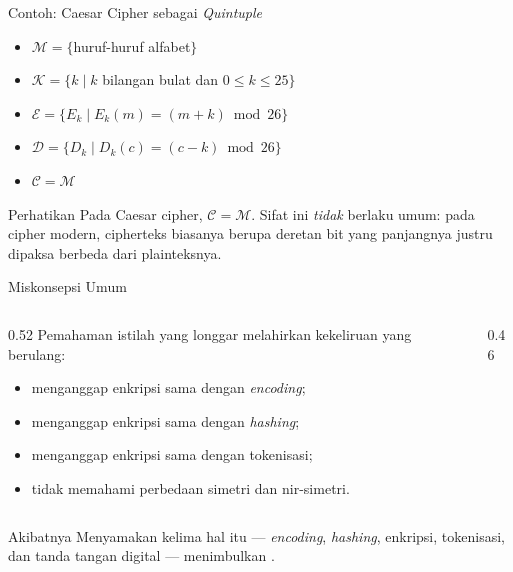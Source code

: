 \documentclass[aspectratio=169,11pt]{beamer}
\begin{document}
\begin{frame}{Contoh: Caesar Cipher sebagai \textit{Quintuple}}
    \begin{itemize}
        \item $\mathcal{M} = \{$huruf-huruf alfabet$\}$
        \item $\mathcal{K} = \{k \mid k$ bilangan bulat dan $0 \le k \le 25\}$
        \item $\mathcal{E} = \{E_k \mid E_k(m) = (m + k) \bmod 26\}$
        \item $\mathcal{D} = \{D_k \mid D_k(c) = (c - k) \bmod 26\}$
        \item $\mathcal{C} = \mathcal{M}$
    \end{itemize}
    \vspace{0.3cm}
    \begin{exampleblock}{Perhatikan}
        Pada Caesar cipher, $\mathcal{C} = \mathcal{M}$. Sifat ini \emph{tidak}
        berlaku umum: pada cipher modern, cipherteks biasanya berupa deretan bit
        yang panjangnya justru dipaksa berbeda dari plainteksnya.
    \end{exampleblock}
\end{frame}

\begin{frame}{Miskonsepsi Umum}
    \footnotesize
    \begin{columns}[T,onlytextwidth]
        \begin{column}{0.52\textwidth}
            Pemahaman istilah yang longgar melahirkan kekeliruan yang berulang:
            \begin{itemize}
                \item menganggap enkripsi sama dengan \textit{encoding};
                \item menganggap enkripsi sama dengan \textit{hashing};
                \item menganggap enkripsi sama dengan tokenisasi;
                \item tidak memahami perbedaan simetri dan nir-simetri.
            \end{itemize}
        \end{column}
        \begin{column}{0.46\textwidth}
            \centering
        \end{column}
    \end{columns}
    \begin{alertblock}{Akibatnya}
        Menyamakan kelima hal itu --- \textit{encoding}, \textit{hashing}, enkripsi,
        tokenisasi, dan tanda tangan digital --- menimbulkan .
    \end{alertblock}
\end{frame}
\end{document}
